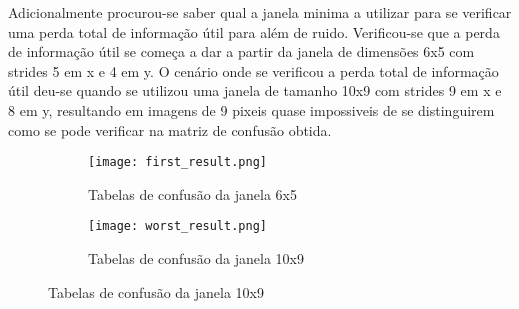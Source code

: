 Adicionalmente procurou-se saber qual a janela minima a utilizar para se verificar uma perda total de informação útil para além de ruido. Verificou-se que a perda de informação útil se começa a dar a partir da janela de dimensões 6x5 com strides 5 em x e 4 em y. \newline
O cenário onde se verificou a perda total de informação útil deu-se quando se utilizou uma janela de tamanho 10x9 com strides 9 em x e 8 em y, resultando em imagens de 9 pixeis quase impossiveis de se distinguirem como se pode verificar na matriz de confusão obtida.

\begin{figure}[H]
	
\captionsetup{justification=centering}
  \begin{subfigure}{.5\textwidth}
  \centering
  \texttt{[image: first\_result.png]}
  \caption {Tabelas de confusão da janela 6x5}
  \end{subfigure}
  \begin{subfigure}{.5\textwidth}
  \centering
  \texttt{[image: worst\_result.png]}
  \caption {Tabelas de confusão da janela 10x9}
  \end{subfigure}
\end{figure}


















